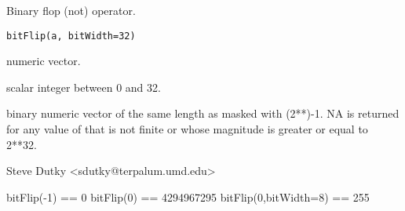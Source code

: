 \begin{Description}\relax
Binary flop (not) operator.
\end{Description}
\begin{Usage}
\begin{verbatim}
bitFlip(a, bitWidth=32)
\end{verbatim}
\end{Usage}
\begin{Arguments}
\begin{ldescription}
\item[\code{a}] numeric vector.
\item[\code{bitWidth}] scalar integer between 0 and 32.
\end{ldescription}
\end{Arguments}
\begin{Value}
binary numeric vector of the same length as  masked with
(2**)-1. NA is returned for any value of  that
is not finite or whose magnitude is greater or equal to 2**32.
\end{Value}
\begin{Author}\relax
Steve Dutky \textless{}sdutky@terpalum.umd.edu\textgreater{}
\end{Author}
\begin{Examples}
\begin{ExampleCode}
  bitFlip(-1) == 0
  bitFlip(0) == 4294967295
  bitFlip(0,bitWidth=8) == 255
\end{ExampleCode}
\end{Examples}

